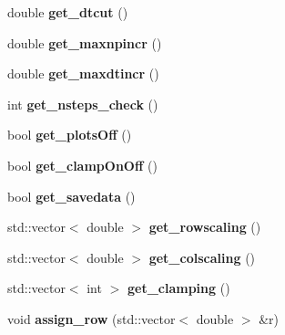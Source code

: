 \begin{DoxyCompactItemize}
\item 
\hypertarget{classAlgor_a6aa753e29ff0eff74e375e5f71244d63}{double {\bfseries get\-\_\-dtcut} ()}\label{classAlgor_a6aa753e29ff0eff74e375e5f71244d63}

\item 
\hypertarget{classAlgor_a027b74a66ed7bb4d7ff55a89d0629aac}{double {\bfseries get\-\_\-maxnpincr} ()}\label{classAlgor_a027b74a66ed7bb4d7ff55a89d0629aac}

\item 
\hypertarget{classAlgor_aea2ff1085b27c5e394d804c70444d1d9}{double {\bfseries get\-\_\-maxdtincr} ()}\label{classAlgor_aea2ff1085b27c5e394d804c70444d1d9}

\item 
\hypertarget{classAlgor_a3dd26e2c4206bfa1670ce4c5dfac9ea9}{int {\bfseries get\-\_\-nsteps\-\_\-check} ()}\label{classAlgor_a3dd26e2c4206bfa1670ce4c5dfac9ea9}

\item 
\hypertarget{classAlgor_a50f37ee9175bddd808c63f4b19cf6a14}{bool {\bfseries get\-\_\-plots\-Off} ()}\label{classAlgor_a50f37ee9175bddd808c63f4b19cf6a14}

\item 
\hypertarget{classAlgor_a59cad442cbe4410a3cc83865c7dd70e0}{bool {\bfseries get\-\_\-clamp\-On\-Off} ()}\label{classAlgor_a59cad442cbe4410a3cc83865c7dd70e0}

\item 
\hypertarget{classAlgor_ad5b677c09e732fb8aa87a12cd3b4b83f}{bool {\bfseries get\-\_\-savedata} ()}\label{classAlgor_ad5b677c09e732fb8aa87a12cd3b4b83f}

\item 
\hypertarget{classAlgor_ae0fef399a53c76792f9e51df2cc893e8}{std\-::vector$<$ double $>$ {\bfseries get\-\_\-rowscaling} ()}\label{classAlgor_ae0fef399a53c76792f9e51df2cc893e8}

\item 
\hypertarget{classAlgor_a76ad8f73dfe4c33a72397de1854b68b2}{std\-::vector$<$ double $>$ {\bfseries get\-\_\-colscaling} ()}\label{classAlgor_a76ad8f73dfe4c33a72397de1854b68b2}

\item 
\hypertarget{classAlgor_a2a64b6672f0a6bc3539ebe4aed4c2d84}{std\-::vector$<$ int $>$ {\bfseries get\-\_\-clamping} ()}\label{classAlgor_a2a64b6672f0a6bc3539ebe4aed4c2d84}

\item 
\hypertarget{classAlgor_a7e853004ea25060d7d0b53311a1670dc}{void {\bfseries assign\-\_\-row} (std\-::vector$<$ double $>$ \&r)}\label{classAlgor_a7e853004ea25060d7d0b53311a1670dc}

\end{DoxyCompactItemize}
